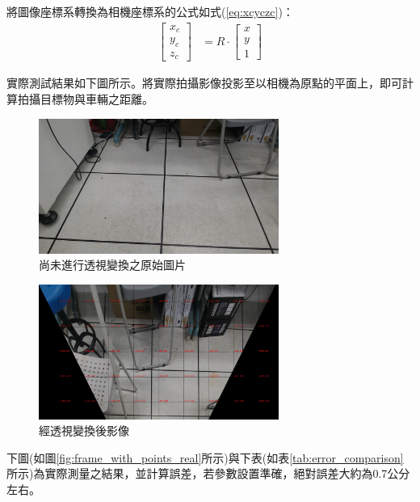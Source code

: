 \documentclass[12pt]{article}       %
\begin{document}
將圖像座標系轉換為相機座標系的公式如式(\ref{eq:xcyczc})：
\begin{align}
    \begin{bmatrix}
        x_{c}   \\
        y_{c}   \\
        z_{c}        
    \end{bmatrix} 
     &=R\cdot
     \begin{bmatrix}
        x       \\
        y       \\
        1        
    \end{bmatrix} 
    \label{eq:xcyczc}
\end{align}

實際測試結果如下圖所示。將實際拍攝影像投影至以相機為原點的平面上，即可計算拍攝目標物與車輛之距離。
\begin{figure}[H]
    \centering
    \includegraphics[width=0.7\textwidth]{11.jpg}     %
    \caption{尚未進行透視變換之原始圖片}    %
    \label{fig:11}    %
\end{figure}
\begin{figure}[H]
    \centering
    \includegraphics[width=0.7\textwidth]{22.jpg}     %
    \caption{經透視變換後影像}    %
    \label{fig:22}    %
\end{figure}

下圖(如圖\ref{fig:frame_with_points_real}所示)與下表(如表\ref{tab:error_comparison}所示)為實際測量之結果，並計算誤差，若參數設置準確，絕對誤差大約為0.7公分左右。
\end{document}
